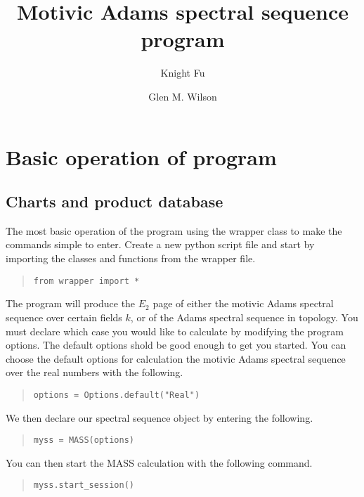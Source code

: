 \documentclass{article}
\begin{document}
\title{Motivic Adams spectral sequence program} \author{Knight Fu \and
  Glen M. Wilson}

\maketitle

\section{Basic operation of program}
\subsection{Charts and product database}

The most basic operation of the program using the wrapper class to
make the commands simple to enter. Create a new python script file and
start by importing the classes and functions from the wrapper file.

\begin{quote}
\begin{verbatim}
from wrapper import *
\end{verbatim}
\end{quote}

The program will produce the $E_2$ page of either the motivic Adams
spectral sequence over certain fields $k$, or of the Adams spectral
sequence in topology. You must declare which case you would like to
calculate by modifying the program options. The default options shold
be good enough to get you started. You can choose the default options
for calculation the motivic Adams spectral sequence over the real
numbers with the following.
\begin{quote}
\begin{verbatim}
options = Options.default("Real")
\end{verbatim}
\end{quote}

We then declare our spectral sequence object by entering the
following.
\begin{quote}
\begin{verbatim}
myss = MASS(options)
\end{verbatim}
\end{quote}
You can then start the MASS calculation with the following command.
\begin{quote}
\begin{verbatim}
myss.start_session()
\end{verbatim}
\end{quote}
\end{document}
